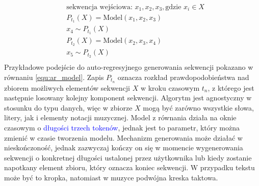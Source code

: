 \documentclass[data-science]{agh-wi} %
\begin{document}
\begin{equation}
    \begin{aligned}
         & \text{sekwencja wejściowa: } x_1, x_2, x_3, \text{gdzie } x_i \in X \\
         & P_{t_1}(X) = \text{Model}(x_1, x_2, x_3)                            \\
         & x_4 \sim P_{t_1}(X)                                                 \\
         & P_{t_2}(X) = \text{Model}(x_2, x_3, x_4)                            \\
         & x_5 \sim P_{t_2}(X)                                                 \\
    \end{aligned}
    \label{equ:ar_model}
\end{equation}
Przykładowe podejście do auto-regresyjnego generowania sekwencji pokazano w równaniu \ref*{equ:ar_model}. Zapis $P_{t_n}$ oznacza rozkład prawdopodobieństwa nad zbiorem możliwych elementów sekwencji $X$ w kroku czasowym $t_n$, z którego jest następnie losowany kolejny komponent sekwencji. Algorytm jest agnostyczny w stosunku do typu danych, więc w zbiorze $X$ mogą być zarówno wszystkie słowa, litery, jak i elementy notacji muzycznej. Model z równania działa na oknie czasowym o \textcolor{blue}{długości trzech tokenów}, jednak jest to parametr, który można zmienić w czasie tworzenia modelu. Mechanizm generowania może działać w nieskończoność, jednak zazwyczaj kończy on się w momencie wygenerowania sekwencji o konkretnej długości ustalonej przez użytkownika lub kiedy zostanie napotkany element zbioru, który oznacza koniec sekwencji. W przypadku tekstu może być to kropka, natomiast w muzyce podwójna kreska taktowa.
\end{document}
